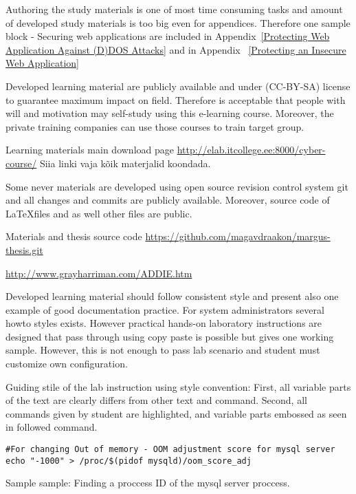 Authoring the study materials is one of most time consuming tasks and amount of developed study materials is too big even for appendices. Therefore one sample block - Securing web applications are included in Appendix~\ref{Protecting Web Application Against (D)DOS Attacks} and in Appendix~ \ref{Protecting an Insecure Web Application} 

Developed learning material are publicly available and under (\gls{CC-BY-SA}) license to guarantee maximum impact on field. Therefore is acceptable that people with will and motivation may self-study using this e-learning course. Moreover, the private training companies can use those courses to train target group.

Learning materials main download page \url{http://elab.itcollege.ee:8000/cyber-course/} {\color{red} Siia linki vaja kõik materjalid koondada.}

Some never materials are developed using open source revision control system \gls{git} and all changes and commits are publicly available. Moreover, source code of \LaTeX  files and as well other files are public.

Materials and thesis source code \url{https://github.com/magavdraakon/margus-thesis.git}



\url{http://www.grayharriman.com/ADDIE.htm}

Developed learning material should follow consistent style and present also one example of good documentation practice. For system administrators several howto styles exists. However practical hands-on laboratory instructions are designed that pass through using copy paste is possible but gives one working sample. However, this is not enough to pass lab scenario and student must customize own configuration.

Guiding stile of the lab instruction using style convention: First, all variable parts of the text are clearly differs from other text and command. Second, all commands given by student are highlighted, and variable parts embossed as seen in followed command.


\begin{verbatim}
#For changing Out of memory - OOM adjustment score for mysql server
echo "-1000" > /proc/$(pidof mysqld)/oom_score_adj
\end{verbatim}



Sample sample: Finding a proccess ID of the mysql server proccess.


